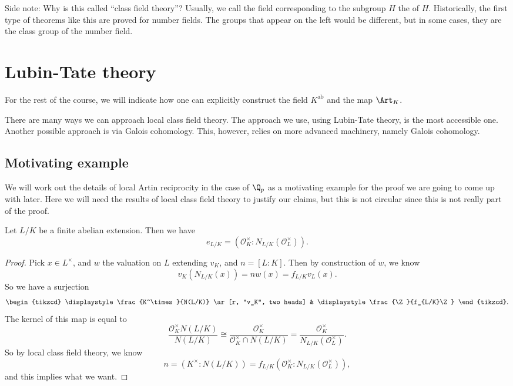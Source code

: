 \documentclass[a4paper]{article}
\begin{document}
Side note: Why is this called ``class field theory''? Usually, we call the field corresponding to the subgroup $H$ the  of $H$. Historically, the first type of theorems like this are proved for number fields. The groups that appear on the left would be different, but in some cases, they are the class group of the number field.

\section{Lubin-Tate theory}
For the rest of the course, we will indicate how one can explicitly construct the field $K^{\mathrm{ab}}$ and the map $\Art_K$.

There are many ways we can approach local class field theory. The approach we use, using Lubin-Tate theory, is the most accessible one. Another possible approach is via Galois cohomology. This, however, relies on more advanced machinery, namely Galois cohomology.

\subsection{Motivating example}
We will work out the details of local Artin reciprocity in the case of $\Q_p$ as a motivating example for the proof we are going to come up with later. Here we will need the results of local class field theory to justify our claims, but this is not circular since this is not really part of the proof.

\begin{lemma}
  Let $L/K$ be a finite abelian extension. Then we have
  \[
    e_{L/K} = (\mathcal{O}_K^\times : N_{L/K}(\mathcal{O}_L^\times)).
  \]
\end{lemma}

\begin{proof}
  Pick $x \in L^\times$, and $w$ the valuation on $L$ extending $v_K$, and $n = [L:K]$. Then by construction of $w$, we know
  \[
    v_K(N_{L/K}(x)) = n w(x) = f_{L/K}v_L(x).
  \]
  So we have a surjection
  \[
    \begin{tikzcd}
      \displaystyle\frac{K^\times}{N(L/K)} \ar[r, "v_K", two heads] & \displaystyle\frac{\Z}{f_{L/K}\Z}
    \end{tikzcd}.
  \]
  The kernel of this map is equal to
  \[
    \frac{\mathcal{O}_K^\times N(L/K)}{N(L/K)} \cong \frac{\mathcal{O}_K^\times}{\mathcal{O}_K^\times \cap N(L/K)} = \frac{\mathcal{O}_K^\times}{N_{L/K}(\mathcal{O}_L^\times)}.
  \]
  So by local class field theory, we know
  \[
    n = (K^\times : N(L/K)) = f_{L/K} (\mathcal{O}_K^\times : N_{L/K}(\mathcal{O}_L^\times)),
  \]
  and this implies what we want.
\end{proof}
\end{document}
